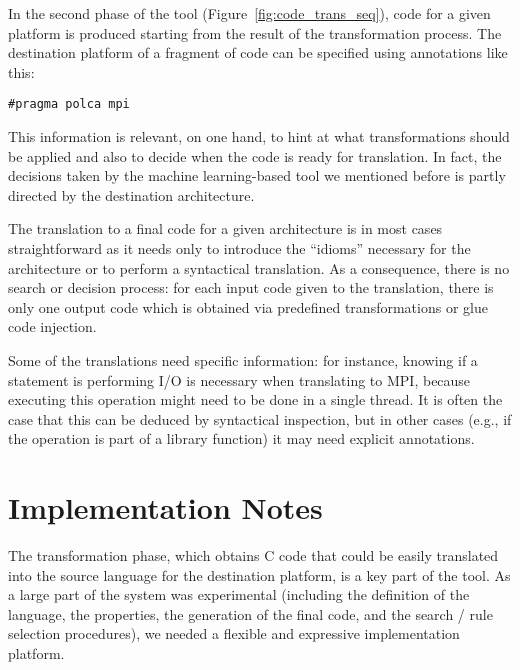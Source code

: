 \documentclass[svgnames,usenames,preprint,nocopyrightspace]{sigplanconf}
\begin{document}
In the second phase of the tool (Figure~\ref{fig:code_trans_seq}),
code for a given platform is produced starting from the result of the
transformation process.  The destination platform of a fragment of
code can be specified using annotations like this:

\medskip

\texttt{\#pragma polca mpi}

\medskip

This information is relevant, on one hand, to hint at what
transformations should be applied and also to decide when the code is
ready for translation.  In fact, the decisions taken by the machine
learning-based tool we mentioned before 
is partly directed by the destination architecture. 




The translation to a final code for a given architecture is in most
cases straightforward as it needs only to introduce the ``idioms''
necessary for the architecture or to perform a syntactical
translation.  As a consequence, there is no search or decision
process: for each input code given to the translation, there is only
one output code
which is obtained via predefined transformations or glue code
injection.




Some of the translations need specific information: for instance,
knowing if a statement is performing I/O is necessary when translating
to MPI, because  executing this operation might need to be done in a
single thread.  It is often the case that this can be deduced by
syntactical inspection, but in other cases (e.g., if the operation is
part of a library function) it may need explicit annotations.






\section{Implementation Notes}
\label{sec:implementation}



The transformation phase, which obtains C code that could be easily
translated into the source language for the destination platform, is a
key part of the tool.  As a large part of the system was experimental
(including the definition of the language, the properties, the
generation of the final code, and the search / rule selection
procedures), we needed a flexible and expressive implementation
platform.
\end{document}
